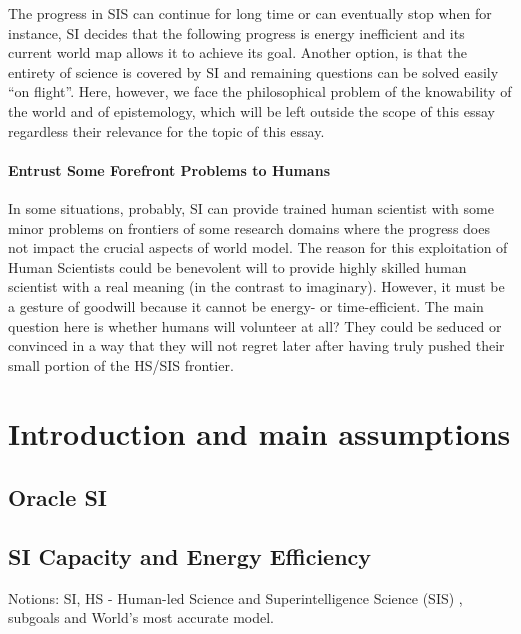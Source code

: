 \documentclass[a4paper,11pt]{article}
\begin{document}
The progress in SIS can continue for long time or can eventually stop when for instance, SI decides that the following progress is energy inefficient and its current world map allows it to achieve its goal. Another option, is that the entirety of science is covered by SI and remaining questions can be solved easily ``on flight''. Here, however, we face the philosophical problem of the knowability of the world and of epistemology, which will be left outside the scope of this essay regardless their relevance for the topic of this essay.


\paragraph{Entrust Some Forefront Problems to Humans}
In some situations, probably, SI can provide trained human scientist with some minor problems on frontiers of some research domains where the progress does not impact the crucial aspects of world model. The reason for this exploitation of Human Scientists could be benevolent will to provide highly skilled human scientist with a real meaning (in the contrast to imaginary). However, it must be a gesture of goodwill because it cannot be  energy- or time-efficient. The main question here is whether humans will volunteer at all? They could be seduced or convinced in a way that they will not regret later after having truly pushed their small portion of the HS/SIS frontier.


\newpage

	\section{Introduction and main assumptions}

        \subsection{Oracle SI}

        \subsection{SI Capacity and Energy Efficiency}

        Notions: SI, HS - Human-led Science  and Superintelligence Science (SIS) , subgoals and World's most accurate model.
\end{document}
